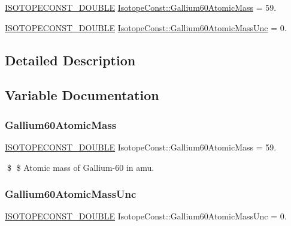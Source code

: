 \begin{DoxyCompactItemize}
\item 
\mbox{\hyperlink{group___isotope_const-_macros_ga8f45a7272ce02c0b4c65c44636ed719a}{I\+S\+O\+T\+O\+P\+E\+C\+O\+N\+S\+T\+\_\+\+D\+O\+U\+B\+LE}} \mbox{\hyperlink{group___isotope_const-_gallium-_ga60_ga045a537bfab504a135150962dc29136d}{Isotope\+Const\+::\+Gallium60\+Atomic\+Mass}} = 59.
\item 
\mbox{\hyperlink{group___isotope_const-_macros_ga8f45a7272ce02c0b4c65c44636ed719a}{I\+S\+O\+T\+O\+P\+E\+C\+O\+N\+S\+T\+\_\+\+D\+O\+U\+B\+LE}} \mbox{\hyperlink{group___isotope_const-_gallium-_ga60_ga2561f943301628305e468ebce18f1ba3}{Isotope\+Const\+::\+Gallium60\+Atomic\+Mass\+Unc}} = 0.
\end{DoxyCompactItemize}


\subsection{Detailed Description}


\subsection{Variable Documentation}
\mbox{\label{group___isotope_const-_gallium-_ga60_ga045a537bfab504a135150962dc29136d}} 
\subsubsection{\texorpdfstring{Gallium60\+Atomic\+Mass}{Gallium60AtomicMass}}
{\footnotesize\ttfamily \mbox{\hyperlink{group___isotope_const-_macros_ga8f45a7272ce02c0b4c65c44636ed719a}{I\+S\+O\+T\+O\+P\+E\+C\+O\+N\+S\+T\+\_\+\+D\+O\+U\+B\+LE}} Isotope\+Const\+::\+Gallium60\+Atomic\+Mass = 59.}

\$ \$ Atomic mass of Gallium-\/60 in amu. \mbox{\label{group___isotope_const-_gallium-_ga60_ga2561f943301628305e468ebce18f1ba3}} 
\subsubsection{\texorpdfstring{Gallium60\+Atomic\+Mass\+Unc}{Gallium60AtomicMassUnc}}
{\footnotesize\ttfamily \mbox{\hyperlink{group___isotope_const-_macros_ga8f45a7272ce02c0b4c65c44636ed719a}{I\+S\+O\+T\+O\+P\+E\+C\+O\+N\+S\+T\+\_\+\+D\+O\+U\+B\+LE}} Isotope\+Const\+::\+Gallium60\+Atomic\+Mass\+Unc = 0.}

